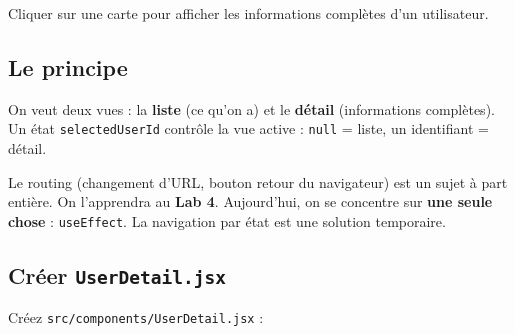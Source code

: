 \documentclass[11pt,a4paper]{article}
\begin{document}
\begin{objectifbox}
Cliquer sur une carte pour afficher les informations complètes d'un utilisateur.
\end{objectifbox}

\subsection{Le principe}

On veut deux vues : la \textbf{liste} (ce qu'on a) et le \textbf{détail} (informations complètes). Un état \texttt{selectedUserId} contrôle la vue active : \texttt{null} = liste, un identifiant = détail.

\begin{infobox}
Le routing (changement d'URL, bouton retour du navigateur) est un sujet à part entière. On l'apprendra au \textbf{Lab 4}. Aujourd'hui, on se concentre sur \textbf{une seule chose} : \texttt{useEffect}. La navigation par état est une solution temporaire.
\end{infobox}

\subsection{Créer \texttt{UserDetail.jsx}}

Créez \texttt{src/components/UserDetail.jsx} :
\end{document}
